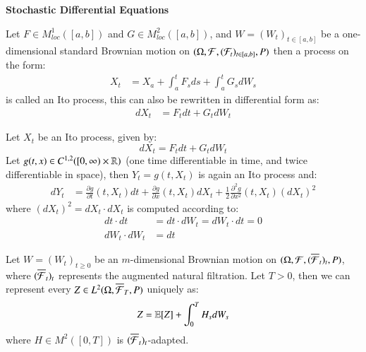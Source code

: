 \newpage 

\centerline{\textbf{Stochastic Differential Equations}}
\begin{definition}
Let $F\in M^{1}_{loc}([a,b])$  and $G\in M^{2}_{loc}([a,b])$, and $W = (W_{t})_{t\in [a,b]}$ be a one-dimensional standard Brownian motion on $(\Omega,\mathcal{F}, (\mathcal{F}_{t})_{t\in [a,b]},P)$  then a process on the form: 
\begin{align*}
X_{t} &= X_{a} + \int_{a}^{t}F_{s}ds + \int_{a}^{t}G_{s}dW_{s}    
\end{align*}
is called an Ito process, this can also be rewritten in differential form as: 
\begin{align*}
dX_{t} &= F_{t}dt + G_{t}dW_{t}    
\end{align*}
\end{definition} 

\begin{theorem}
\label{thm: Ito's_formula}
Let $X_{t}$ be an Ito process, given by:
$$
dX_{t} = F_{t}dt + G_{t}dW_{t}
$$
Let $g(t,x) \in C^{1,2}([0,\infty) \times \mathbb{R})$ (one time differentiable in time, and twice differentiable in space), then $Y_{t} = g(t,X_{t})$ is again an Ito process and:
\begin{align*}
dY_{t} &= \frac{\partial g}{\partial t}(t,X_{t})dt + 
\frac{\partial g}{\partial x}(t,X_{t})dX_{t} + 
\frac{1}{2}\frac{\partial^{2}g}{\partial x^{2}}(t,X_{t})(dX_{t})^{2}
\end{align*}
where $(dX_{t})^{2} = dX_{t}\cdot dX_{t}$ is computed according to:
\begin{align*}
dt\cdot dt &= dt\cdot dW_{t} = dW_{t}\cdot dt = 0 \\ 
dW_{t}\cdot dW_{t} &= dt
\end{align*}
\end{theorem} 


\begin{theorem}
Let $W = (W_{t})_{t\geq 0}$ be an $m$-dimensional Brownian motion on $(\Omega, \mathcal{F}, (\overline{\mathcal{F}}_{t})_{t}, P)$, where $(\overline{\mathcal{F}}_{t})_{t}$ represents the augmented natural filtration. Let $T>0$, then we can represent every $Z\in L^{2}(\Omega, \overline{\mathcal{F}}_{T}, P)$ uniquely as: 
$$
Z = \mathbb{E}[Z] + \int_{0}^{T}H_{s}dW_{s}
$$
where $H \in M^{2}([0,T])$ is $(\overline{\mathcal{F}}_{t})_{t}$-adapted.
\end{theorem}

